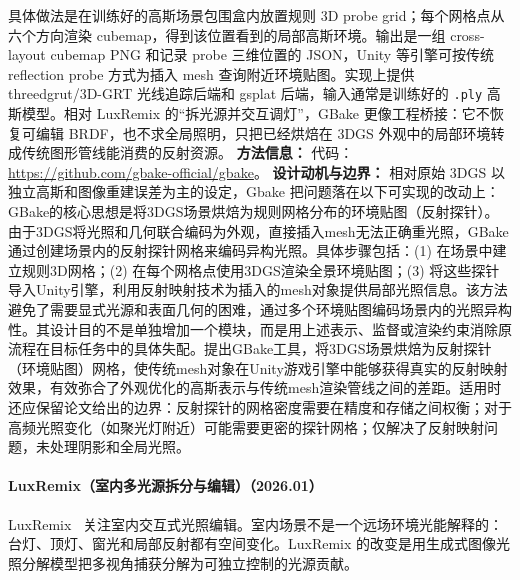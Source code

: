 具体做法是在训练好的高斯场景包围盒内放置规则 3D probe grid；每个网格点从六个方向渲染 cubemap，得到该位置看到的局部高斯环境。输出是一组 cross-layout cubemap PNG 和记录 probe 三维位置的 JSON，Unity 等引擎可按传统 reflection probe 方式为插入 mesh 查询附近环境贴图。实现上提供 threedgrut/3D-GRT 光线追踪后端和 gsplat 后端，输入通常是训练好的 \texttt{.ply} 高斯模型。相对 LuxRemix 的“拆光源并交互调灯”，GBake 更像工程桥接：它不恢复可编辑 BRDF，也不求全局照明，只把已经烘焙在 3DGS 外观中的局部环境转成传统图形管线能消费的反射资源。
\textbf{方法信息：} 代码：\url{https://github.com/gbake-official/gbake}。
\textbf{设计动机与边界：} 相对原始 3DGS 以独立高斯和图像重建误差为主的设定，Gbake 把问题落在以下可实现的改动上：GBake的核心思想是将3DGS场景烘焙为规则网格分布的环境贴图（反射探针）。由于3DGS将光照和几何联合编码为外观，直接插入mesh无法正确重光照，GBake通过创建场景内的反射探针网格来编码异构光照。具体步骤包括：(1) 在场景中建立规则3D网格；(2) 在每个网格点使用3DGS渲染全景环境贴图；(3) 将这些探针导入Unity引擎，利用反射映射技术为插入的mesh对象提供局部光照信息。该方法避免了需要显式光源和表面几何的困难，通过多个环境贴图编码场景内的光照异构性。其设计目的不是单独增加一个模块，而是用上述表示、监督或渲染约束消除原流程在目标任务中的具体失配。提出GBake工具，将3DGS场景烘焙为反射探针（环境贴图）网格，使传统mesh对象在Unity游戏引擎中能够获得真实的反射映射效果，有效弥合了外观优化的高斯表示与传统mesh渲染管线之间的差距。适用时还应保留论文给出的边界：反射探针的网格密度需要在精度和存储之间权衡；对于高频光照变化（如聚光灯附近）可能需要更密的探针网格；仅解决了反射映射问题，未处理阴影和全局光照。
\paragraph{LuxRemix（室内多光源拆分与编辑）（2026.01）}
LuxRemix~\cite{2601_15283} 关注室内交互式光照编辑。室内场景不是一个远场环境光能解释的：台灯、顶灯、窗光和局部反射都有空间变化。LuxRemix 的改变是用生成式图像光照分解模型把多视角捕获分解为可独立控制的光源贡献。


